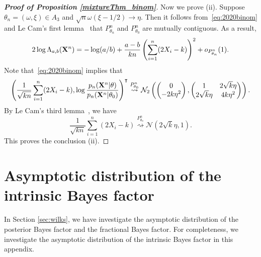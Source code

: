 \documentclass[11pt]{article}
\newcommand{\myT}{\intercal}
\theoremstyle{plain}
\theoremstyle{definition}
\theoremstyle{remark}
\begin{document}
\begin{appendices}
\begin{proof}[\textbf{Proof of Proposition \ref{mixtureThm_binom}}]
Now we prove (ii).
Suppose $\theta_n = (\omega, \xi) \in A_3$ and $\sqrt n \omega (\xi - 1/2) \to \eta$.
Then it follows from~\eqref{eq:2020binom} and Le Cam's first lemma~\citep[Theorem 6.4]{van2000asymptotic} that
$P^n_{\theta_n}$ and $P^n_{\theta_0}$ are mutually contiguous.
As a result,
\begin{align*}
    2\log \Lambda_{a,b} (\mathbf{X}^n)
    =
    -\log(a/b) + \frac{a-b}{kn} \left( \sum_{i=1}^n (2X_i - k)\right)^2 + o_{P_{\theta_n}^n}(1).
\end{align*}
Note that~\eqref{eq:2020binom} implies that
\begin{equation*}
    \left(\frac{1}{\sqrt{kn}}\sum_{i=1}^n (2X_i-k), \log \frac{p_n(\BX^{n}|\theta)}{p_n(\BX^{n}|\theta_0)}\right)^\myT 
        \overset{P^n_{\theta_0}}{\rightsquigarrow}
        \mathcal{N}_2\left(
    \begin{pmatrix}
        0\\
        -2k\eta^2
    \end{pmatrix}
    ,
    \begin{pmatrix}
        1 & 2 \sqrt k \eta\\
        2 \sqrt k \eta & 4k \eta^2
    \end{pmatrix}
\right).
\end{equation*}
By Le Cam's third lemma~\citep[Example 6.7]{van2000asymptotic}, we have
\begin{equation*}
    \frac{1}{\sqrt{kn}}\sum_{i=1}^n (2X_i - k)
    \overset{P^n_{\theta_n}}{\rightsquigarrow} \mathcal{N}(2 \sqrt k \eta,1).
\end{equation*}
This proves the conclusion (ii).


\end{proof}


\section{Asymptotic distribution of the intrinsic Bayes factor}\label{app:intrinsic}
In Section \ref{sec:wilks}, we have investigate the asymptotic distribution of the posterior Bayes factor and the fractional Bayes factor.
For completeness, we investigate the asymptotic distribution of the intrinsic Bayes factor in this appendix.


\end{appendices}
\end{document}
